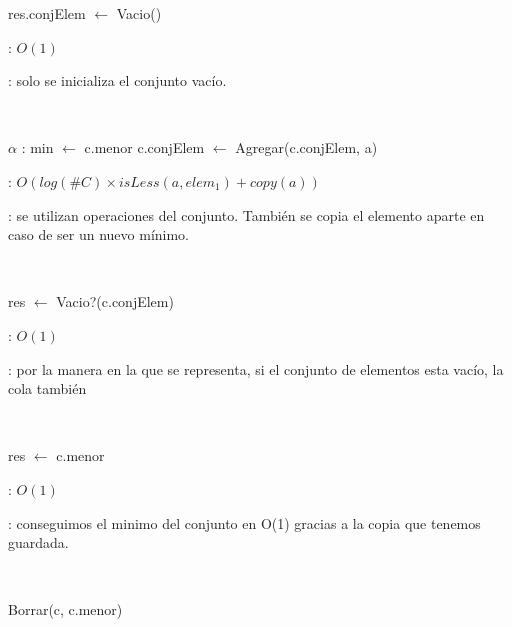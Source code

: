 \begin{Algoritmos}

	\begin{algorithm}[H]
		\NoCaptionOfAlgo
		\caption{}
		res.conjElem $\leftarrow$ Vacio()
	\end{algorithm}

	\complejidad: $O(1)$

	\justifcomp: solo se inicializa el conjunto vacío.

	~

	\begin{algorithm}[H]
		\NoCaptionOfAlgo
		\caption{}
		$\alpha$ : min $\leftarrow$ c.menor
		c.conjElem $\leftarrow$ Agregar(c.conjElem, a)
	\end{algorithm}

	\complejidad: $O(log(\#C) \times isLess(a, elem_1) + copy(a))$

	\justifcomp: se utilizan operaciones del conjunto. También se copia el elemento aparte en caso de ser un nuevo mínimo.

	~

	\begin{algorithm}[H]
		\NoCaptionOfAlgo
		\caption{}
		res $\leftarrow$ Vacio?(c.conjElem)
	\end{algorithm}

	\complejidad: $O(1)$

	\justifcomp: por la manera en la que se representa, si el conjunto de elementos esta vacío, la cola también

	~

	\begin{algorithm}[H]
		\NoCaptionOfAlgo
		\caption{}
		res $\leftarrow$ c.menor
	\end{algorithm}

	\complejidad: $O(1)$

	\justifcomp: conseguimos el minimo del conjunto en O(1) gracias a la copia que tenemos guardada.

	~

	\begin{algorithm}[H]
		\NoCaptionOfAlgo
		\caption{}
		Borrar(c, c.menor)
	\end{algorithm}


\end{Algoritmos}
